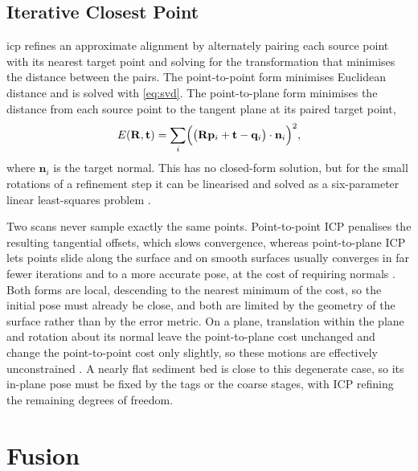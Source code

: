 \subsection{Iterative Closest Point}
\label{sec:theory_icp}
\gls{icp} refines an approximate alignment by alternately pairing each source point with its nearest target point and solving for the transformation that minimises the distance between the pairs. The point-to-point form \cite{beslMethodRegistration3D1992} minimises Euclidean distance and is solved with \autoref{eq:svd}. The point-to-plane form \cite{chenObjectModellingRegistration1992} minimises the distance from each source point to the tangent plane at its paired target point,
\begin{equation}
E(\mathbf{R},\mathbf{t})=\sum_i\Bigl(\bigl(\mathbf{R}\mathbf{p}_i+\mathbf{t}-\mathbf{q}_i\bigr)\cdot\mathbf{n}_i\Bigr)^2 ,
\label{eq:p2plane}
\end{equation}
where $\mathbf{n}_i$ is the target normal. This has no closed-form solution, but for the small rotations of a refinement step it can be linearised and solved as a six-parameter linear least-squares problem \cite{lowLinearLeastSquaresOptimizationa}.

Two scans never sample exactly the same points. Point-to-point ICP penalises the resulting tangential offsets, which slows convergence, whereas point-to-plane ICP lets points slide along the surface and on smooth surfaces usually converges in far fewer iterations and to a more accurate pose, at the cost of requiring normals \cite{rusinkiewiczEfficientVariantsICP2001}. Both forms are local, descending to the nearest minimum of the cost, so the initial pose must already be close, and both are limited by the geometry of the surface rather than by the error metric. On a plane, translation within the plane and rotation about its normal leave the point-to-plane cost unchanged and change the point-to-point cost only slightly, so these motions are effectively unconstrained \cite{gelfandGeometricallyStableSampling2003}. A nearly flat sediment bed is close to this degenerate case, so its in-plane pose must be fixed by the tags or the coarse stages, with ICP refining the remaining degrees of freedom.

\section{Fusion}
\label{sec:theory_fusion}

